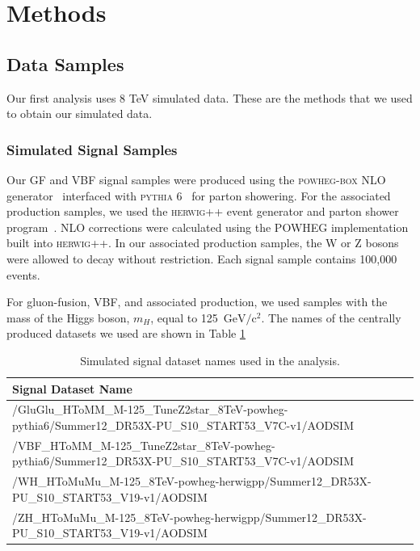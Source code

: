 \documentclass[12pt]{article}
\begin{document}
\section{Methods}

\subsection{Data Samples}

Our first analysis uses 8 TeV simulated data. These are the methods that we used to obtain our simulated data.

\subsubsection{Simulated Signal Samples}

Our GF and VBF signal samples were produced using the \textsc{powheg-box} NLO generator~\cite{powheg1,powheg2,powheg3} 
interfaced with \textsc{pythia} 6~\cite{pythia} for parton showering.
For the associated production samples, we used the \textsc{herwig}++ event generator and 
parton shower program~\cite{herwigpp}.  NLO corrections were calculated using the 
POWHEG implementation built into \textsc{herwig}++. 
In our associated production samples, the W or Z bosons were allowed to decay without restriction.
Each signal sample contains 100,000 events.

For gluon-fusion, VBF, and associated production, we used samples with the mass of the Higgs boson, $m_H$, equal to 125~$\textrm{GeV}/\textrm{c}^{2}$. 
The names of the centrally produced datasets we used are shown in Table \ref{tab:sigDatasets}

\begin{table}[htb]
\caption{Simulated signal dataset names used in the analysis.
\label{tab:sigDatasets}
}
\small
\begin{center}
\begin{tabular}{ |p{12cm}|}
\hline
Signal Dataset Name \\
\hline
\hline
/GluGlu\_HToMM\_M-125\_TuneZ2star\_8TeV-powheg-pythia6/Summer12\_DR53X-PU\_S10\_START53\_V7C-v1/AODSIM \\
\hline
/VBF\_HToMM\_M-125\_TuneZ2star\_8TeV-powheg-pythia6/Summer12\_DR53X-PU\_S10\_START53\_V7C-v1/AODSIM \\
\hline
/WH\_HToMuMu\_M-125\_8TeV-powheg-herwigpp/Summer12\_DR53X-PU\_S10\_START53\_V19-v1/AODSIM \\
\hline
/ZH\_HToMuMu\_M-125\_8TeV-powheg-herwigpp/Summer12\_DR53X-PU\_S10\_START53\_V19-v1/AODSIM \\
\hline
\end{tabular}
\end{center}
\end{table}
\end{document}
